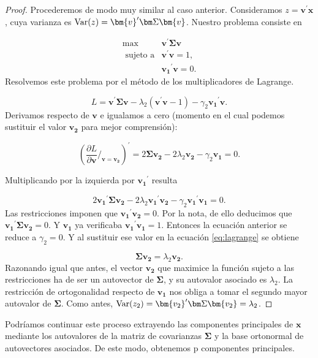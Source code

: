\documentclass[
  a4paper,
  oneside]{scrbook}
\theoremstyle{definition}
\theoremstyle{definition}
\theoremstyle{definition}
\theoremstyle{definition}
\theoremstyle{remark}
\begin{document}
\begin{proof}
Procederemos de modo muy similar al caso anterior. Consideramos
\(z=\bm{v}^{\prime}\bm{x}\), cuya varianza es
\(\textnormal{Var}(z)=\bm{v}^{\prime}\bm\Sigma \bm{v}\). Nuestro problema
consiste en

\[\begin{array}{rl}
\max & \bm{v}^{\prime}\bm\Sigma \bm{v} \\
\mbox{ sujeto a} & \bm{v}^{\prime}\bm{v}=1, \\
 & \bm{v_1}^{\prime} \bm{v}=0.
\end{array}\] Resolvemos este problema por el método de los
multiplicadores de Lagrange.

\[L=\bm{v}^{\prime}\bm\Sigma \bm{v}-\lambda_2(\bm{v}^{\prime}\bm{v}-1)-\gamma_2 \bm{v_1}^{\prime} \bm{v}.\]
Derivamos respecto de \(\bm{v}\) e igualamos a cero (momento en el cual
podemos sustituir el valor \(\bm{v_2}\) para mejor comprensión):

\begin{equation}
\left(\frac{\partial L}{\partial \bm{v}}/_{\bm{v}=\bm{v_2}}\right)^{\prime}
=2\bm\Sigma \bm{v_2}-2\lambda_2 \bm{v_2}-\gamma_2\bm{v_1}=0.
\label{eq:lagrange}
\end{equation}

Multiplicando por la izquierda por \(\bm{v_1}^{\prime}\) resulta

\[2\bm{v_1}^{\prime}\bm\Sigma \bm{v_2} - 2\lambda_2 \bm{v_1}^{\prime} \bm{v_2} - \gamma_2 \bm{v_1}^{\prime}\bm{v_1} =0.\]
Las restricciones imponen que \(\bm{v_1}^{\prime}\bm{v_2}=0\). Por la
nota, de ello deducimos que \(\bm{v_1}^{\prime}\bm\Sigma \bm{v_2}=0\). Y
\(\bm{v_1}\) ya verificaba \(\bm{v_1}^{\prime}\bm{v_1}=1\). Entonces la
ecuación anterior se reduce a \(\gamma_2=0\). Y al sustituir ese valor en
la ecuación \eqref{eq:lagrange} se obtiene

\[\bm\Sigma \bm{v_2}=\lambda_2 \bm{v_2}.\] Razonando igual que antes, el
vector \(\bm{v_2}\) que maximice la función sujeto a las restricciones ha
de ser un autovector de \(\bm\Sigma\), y su autovalor asociado es
\(\lambda_2\). La restricción de ortogonalidad respecto de \(\bm{v_1}\) nos
obliga a tomar el segundo mayor autovalor de \(\bm\Sigma\). Como antes,
\(\textnormal{Var}(z_2)=\bm{v_2}^{\prime}\bm\Sigma \bm{v_2}=\lambda_2\).
\end{proof}

Podríamos continuar este proceso extrayendo las componentes principales
de \(\bm{x}\) mediante los autovalores de la matriz de covarianzas
\(\bm\Sigma\) y la base ortonormal de autovectores asociados. De este
modo, obtenemos p componentes principales.
\end{document}
